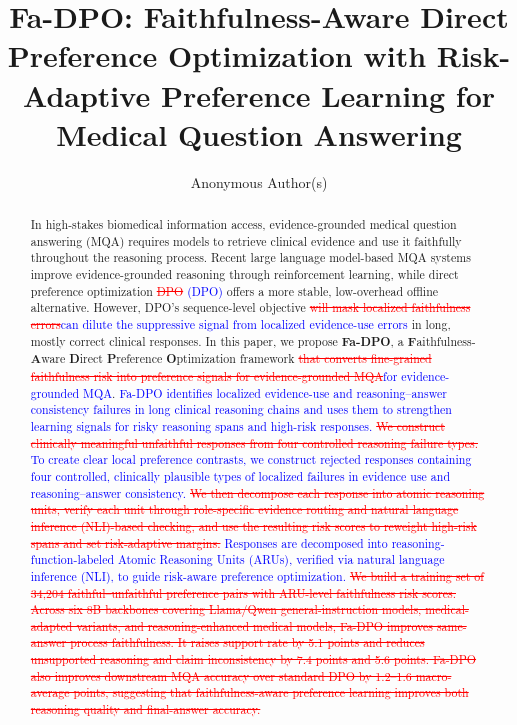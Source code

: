 \documentclass[a4paper,fleqn,doubleblind]{cas-sc}
\DeclareRobustCommand{\deleted}[1]{\textcolor{red}{\sout{#1}}}
\DeclareRobustCommand{\added}[1]{\textcolor{blue}{#1}}
\begin{document}
\let\WriteBookmarks\relax
\def\floatpagepagefraction{1}
\def\textpagefraction{.001}


\title[mode=title]{Fa-DPO: Faithfulness-Aware Direct Preference Optimization with Risk-Adaptive Preference Learning for Medical Question Answering}

\author[1]{Anonymous Author(s)}

\begin{abstract}
In high-stakes biomedical information access, evidence-grounded medical question answering (MQA) requires models to retrieve clinical evidence and use it faithfully throughout the reasoning process.
Recent large language model-based MQA systems improve evidence-grounded reasoning through reinforcement learning, while direct preference optimization \deleted{DPO }\added{(DPO) }offers a more stable, low-overhead offline alternative.
However, DPO's sequence-level objective \deleted{will mask localized faithfulness errors}\added{can dilute the suppressive signal from localized evidence-use errors} in long, mostly correct clinical responses.
In this paper, we propose \textbf{Fa-DPO}, a \textbf{F}aithfulness-\textbf{A}ware \textbf{D}irect \textbf{P}reference \textbf{O}ptimization framework \deleted{that converts fine-grained faithfulness risk into preference signals for evidence-grounded MQA}\added{for evidence-grounded MQA}.
\added{Fa-DPO identifies localized evidence-use and reasoning--answer consistency failures in long clinical reasoning chains and uses them to strengthen learning signals for risky reasoning spans and high-risk responses.}
\deleted{We construct clinically meaningful unfaithful responses from four controlled reasoning failure types.}
\added{To create clear local preference contrasts, we construct rejected responses containing four controlled, clinically plausible types of localized failures in evidence use and reasoning--answer consistency.}
\deleted{We then decompose each response into atomic reasoning units, verify each unit through role-specific evidence routing and natural language inference (NLI)-based checking, and use the resulting risk scores to reweight high-risk spans and set risk-adaptive margins.}
\added{Responses are decomposed into reasoning-function-labeled Atomic Reasoning Units (ARUs), verified via natural language inference (NLI), to guide risk-aware preference optimization.}
\deleted{We build a training set of 34,204 faithful--unfaithful preference pairs with ARU-level faithfulness risk scores. Across six 8B backbones covering Llama/Qwen general-instruction models, medical-adapted variants, and reasoning-enhanced medical models, Fa-DPO improves same-answer process faithfulness. It raises support rate by 5.1 points and reduces unsupported reasoning and claim inconsistency by 7.4 points and 5.6 points. Fa-DPO also improves downstream MQA accuracy over standard DPO by 1.2--1.6 macro-average points, suggesting that faithfulness-aware preference learning improves both reasoning quality and final-answer accuracy.}

\end{abstract}
\end{document}
